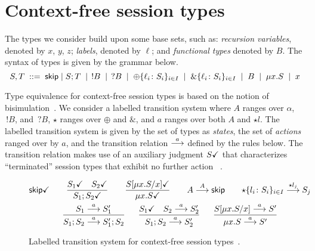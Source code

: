 \section{Context-free session types}
\label{sec:contextfreesession}

The types we consider build upon some base sets, such as:
\emph{recursion variables}, denoted by $x$, $y$, $z$;
\emph{labels}, denoted by $\ell$; and \emph{functional types} denoted by
$B$.  The syntax of types is given by the grammar below.%
%
\begin{equation*}
    S,T \grmeq \skipk \mid S;T \grmor \,!B \grmor \,?B \grmor 
       \oplus\{\ell_i\colon S_i\}_{i\in I} \grmor \&\{\ell_i\colon S_i\}_{i\in I} \grmor B \grmor
       \mu x.S \grmor x
\end{equation*}

Type equivalence for context-free session types is based on the notion
of bisimulation~\cite{thiemann2016context}.%
 We consider a labelled transition system where $A$ ranges
over $\alpha$, $\,!B$, and $\,?B$, $\star$ ranges over $\oplus$ and
$\&$, and $a$ ranges over both $A$ and $\star l$.
%
The labelled transition system is given by the set of types as
\emph{states}, the set of \emph{actions} ranged over by $a$, and the
transition relation $\LTSderives$ defined by the rules below. The
transition relation makes use of an auxiliary judgment $\DONE{S}$ that
characterizes ``terminated'' session types that exhibit no further
action~\cite{DBLP:journals/jacm/AcetoH92} .
%
\begin{figure}
  \begin{gather*}
    \DONE{\skipk}
    \qquad
    \frac{\DONE{S_1} \quad \DONE{S_2}}{\DONE{S_1; S_2}}
    \qquad
    \frac{\DONE{S[\mu x.S/x]}}{\DONE{\mu x.S}}
    \qquad
    {A \LTSderives[A] \skipk }
    \qquad
    {\star\{l_i\colon S_i\}_{i\in I} \LTSderives[\star l_j] S_j}
    \\
    \frac{S_1 \LTSderives S_1'}{S_1; S_2 \LTSderives S_1';S_2}
    \quad\;\;
    \frac{\DONE{S_1} \quad S_2 \LTSderives S_2'}{S_1; S_2 \LTSderives S_2'}
    \quad\;\;
    \frac{S[\mu x.S/x] \LTSderives S'}{\mu x.S \LTSderives S'}
  \end{gather*}
\caption{Labelled transition system for context-free session types~\cite{thiemann2016context}.}
\label{lts}
\end{figure}

